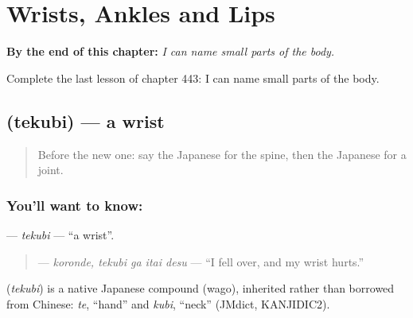 
\chapter{Wrists, Ankles and Lips}
\label{ch:ja-wrists-ankles-and-lips}

\begin{chapteropening}
\textbf{By the end of this chapter:} \emph{I can name small parts of the body.}

Complete the last lesson of chapter 443: I can name small parts of the body.
\end{chapteropening}

\section[\texorpdfstring{\ja{てくび} (tekubi)}{てくび (tekubi)}]{ (tekubi) — a wrist}

\label{lesson:JA-C443-tekubi}



\begin{quote}
Before the new one: say the Japanese for the spine, then the Japanese for a joint.
\end{quote}

\subsection*{You'll want to know: }
\textbf{} — \emph{tekubi} — \textquotedblleft{}a wrist\textquotedblright{}.

\begin{quote}
\textbf{ } — \emph{koronde, tekubi ga itai desu} — \textquotedblleft{}I fell over, and my wrist hurts.\textquotedblright{}
\end{quote}

\begin{cousinweb}
\textbf{} (\emph{tekubi}) is a native Japanese compound (wago), inherited rather than borrowed from Chinese: \emph{te}, \textquotedblleft{}hand\textquotedblright{} and \emph{kubi}, \textquotedblleft{}neck\textquotedblright{} (JMdict, KANJIDIC2).
\end{cousinweb}

